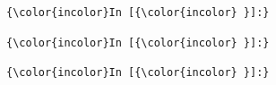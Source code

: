 \documentclass[11pt]{article}
\begin{document}
    \begin{Verbatim}[commandchars=\\\{\}]
{\color{incolor}In [{\color{incolor} }]:}
\end{Verbatim}

    \begin{Verbatim}[commandchars=\\\{\}]
{\color{incolor}In [{\color{incolor} }]:}
\end{Verbatim}

    \begin{Verbatim}[commandchars=\\\{\}]
{\color{incolor}In [{\color{incolor} }]:}
\end{Verbatim}





    
\end{document}
